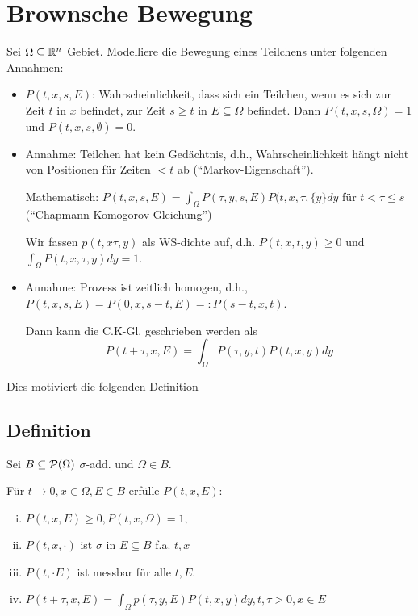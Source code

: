 \section{Brownsche Bewegung}

Sei $\Omega \subseteq \mathbb{R}^n$ Gebiet. Modelliere die Bewegung eines Teilchens unter folgenden Annahmen:

\begin{itemize}
  \item $P(t,x,s,E)$: Wahrscheinlichkeit, dass sich ein Teilchen, wenn es sich zur Zeit $t$ in $x$ befindet, zur Zeit $s \geq t$ in $E \subseteq \Omega$ befindet.
    Dann $P(t,x,s,\Omega) = 1$ und $P(t,x,s,\emptyset) = 0$.

  \item Annahme: Teilchen hat kein Gedächtnis, d.h., Wahrscheinlichkeit hängt nicht von Positionen für Zeiten $< t$ ab (``Markov-Eigenschaft'').

    Mathematisch: $P(t,x,s,E) = \int_\Omega P(\tau,y,  s, E)P(t,x,\tau,\{y\} dy$ für $t < \tau \leq s$ (``Chapmann-Komogorov-Gleichung'')

    Wir fassen $p(t,x\tau,y)$ als WS-dichte auf, d.h. $P(t,x,t,y) \geq 0$ und $\int_\Omega P(t,x,\tau,y) dy = 1$.

  \item Annahme: Prozess ist zeitlich homogen, d.h., $P(t,x,s,E) = P(0,x,s-t, E) =: P(s-t, x, t)$.

    Dann kann die C.K-Gl. geschrieben werden als
    $$
    P(t + \tau, x, E) = \int_\Omega P(\tau, y, t)P(t,x,y) dy
    $$
\end{itemize}

Dies motiviert die folgenden Definition

\subsection{Definition}

Sei $B \subseteq \mathcal{P}(\Omega)$ $\sigma$-add. und $\Omega \in B$.

Für $t \to 0, x \in \Omega, E \in B$ erfülle $P(t,x,E)$:
\begin{enumerate}[i)]
  \item $P(t,x,E) \geq 0, P(t,x,\Omega) = 1,$
  \item $P(t,x,\cdot)$ ist $\sigma$  in $E \subseteq B$ f.a. $t,x$
  \item $P(t,\cdot E)$ ist messbar für alle $t, E$.
  \item $P(t + \tau, x, E) = \int_\Omega p(\tau, y, E)P(t, x, y) dy, t, \tau > 0, x \in E$
\end{enumerate}

